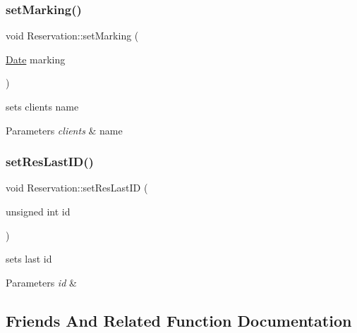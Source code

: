 \subsubsection{\texorpdfstring{set\+Marking()}{setMarking()}}
{\footnotesize\ttfamily void Reservation\+::set\+Marking (\begin{DoxyParamCaption}\item[{\hyperlink{class_date}{Date}}]{marking }\end{DoxyParamCaption})\hspace{0.3cm}{\ttfamily [inline]}}



sets clients name 


\begin{DoxyParams}{Parameters}
{\em clients} & name \\
\hline
\end{DoxyParams}
\hypertarget{class_reservation_ad4f0df816beef2705e8b1ac555ce6243}{}\label{class_reservation_ad4f0df816beef2705e8b1ac555ce6243} 
\subsubsection{\texorpdfstring{set\+Res\+Last\+I\+D()}{setResLastID()}}
{\footnotesize\ttfamily void Reservation\+::set\+Res\+Last\+ID (\begin{DoxyParamCaption}\item[{unsigned int}]{id }\end{DoxyParamCaption})\hspace{0.3cm}{\ttfamily [static]}}



sets last id 


\begin{DoxyParams}{Parameters}
{\em id} & \\
\hline
\end{DoxyParams}


\subsection{Friends And Related Function Documentation}
\hypertarget{class_reservation_ad08627b6936df4b1b1a5c0351355ffbe}{}\label{class_reservation_ad08627b6936df4b1b1a5c0351355ffbe} 
